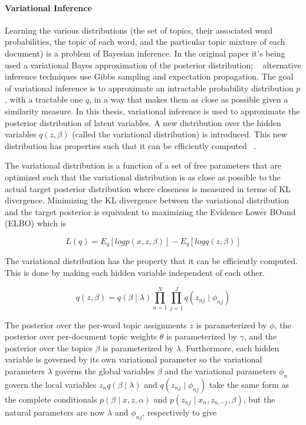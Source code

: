\documentclass[12pt]{report}
\begin{document}
\paragraph{Variational Inference}

Learning the various distributions (the set of topics, their associated word
probabilities, the topic of each word, and the particular topic mixture of each
document) is a problem of Bayesian inference. In the original paper it's being
used a variational Bayes approximation of the posterior distribution;
~\cite{blei2003latent} alternative inference techniques use Gibbs sampling and
expectation propagation. The goal of variational inference is to approximate an
intractable probability distribution $p$, with a tractable one $q$, in a way
that makes them as close as possible given a similarity measure. In this thesis,
variational inference is used to approximate the posterior distribution of
latent variables. A new distribution over the hidden variables $q(z, \beta)$
(called the variational distribution) is  introduced. This new distribution has
properties such that it can be efficiently computed ~\cite{Fox2011ATO}. 

The variational distribution is a function of a set of free parameters that are optimized such that the variational distribution is as close as possible to the 
actual target posterior distribution where closeness is measured in terms of KL divergence.
Minimizing the KL divergence between the variational distribution and the target
posterior is equivalent to maximizing the Evidence Lower BOund (ELBO) which is

\begin{equation}
L(q) = E_q [log p(x, z, \beta)] -  E_q [log q(z, \beta)]  
\end{equation}

The variational distribution has the property that it can be efficiently
computed. This is done by making each hidden variable independent of each other.

\begin{equation}
q(z, \beta) = q(\beta \mid \lambda) \prod\limits_{n=1}^N \prod\limits_{j=1}^J q(z_{nj} \mid \phi_{nj})   
\end{equation}

The posterior over the per-word topic assignments $z$ is parameterized by
$\phi$, the posterior over per-document topic weights $\theta$ is parameterized
by $\gamma$, and the posterior over the topics $\beta$ is parameterized by
$\lambda$. Furthermore, each hidden variable is governed by its own variational
parameter so the variational parameters $\lambda$ governs the global variables
$\beta$ and the variational parameters $\phi_n$ govern the local variables $z_n
q(\beta \mid \lambda)$ and $q(z_{nj} \mid \phi_{nj})$ take the same form as the
complete conditionals $p(\beta \mid x, z, \alpha)$ and $p(z_{nj} \mid x_n, z_{n,
-j}, \beta)$, but the natural parameters are now $\lambda$ and $\phi_{nj}$,
respectively to give
\end{document}
